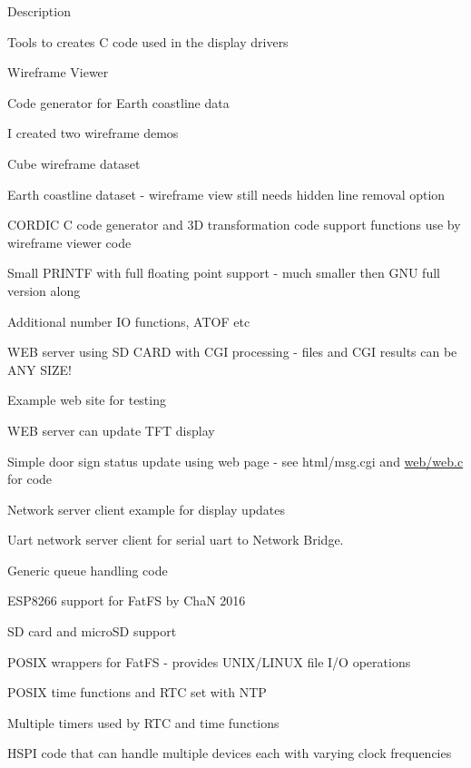 \begin{DoxyParagraph}{Description}
\begin{DoxyItemize}
\begin{DoxyItemize}
\begin{DoxyItemize}
\item Tools to creates C code used in the display drivers
\end{DoxyItemize}
\item Wireframe Viewer
\begin{DoxyItemize}
\item Code generator for Earth coastline data
\item I created two wireframe demos
\begin{DoxyItemize}
\item Cube wireframe dataset
\item Earth coastline dataset -\/ wireframe view still needs hidden line removal option
\end{DoxyItemize}
\end{DoxyItemize}
\item C\+O\+R\+D\+IC C code generator and 3D transformation code support functions use by wireframe viewer code
\item Small P\+R\+I\+N\+TF with full floating point support -\/ much smaller then G\+NU full version along
\item Additional number IO functions, A\+T\+OF etc
\item W\+EB server using SD C\+A\+RD with C\+GI processing -\/ files and C\+GI results can be A\+NY S\+I\+Z\+E!
\begin{DoxyItemize}
\item Example web site for testing
\item W\+EB server can update T\+FT display
\begin{DoxyItemize}
\item Simple door sign status update using web page -\/ see html/msg.\+cgi and \hyperlink{web_8c}{web/web.\+c} for code
\end{DoxyItemize}
\end{DoxyItemize}
\item Network server client example for display updates
\item Uart network server client for serial uart to Network Bridge.
\item Generic queue handling code
\item E\+S\+P8266 support for Fat\+FS by ChaN 2016
\begin{DoxyItemize}
\item SD card and micro\+SD support
\end{DoxyItemize}
\item P\+O\+S\+IX wrappers for Fat\+FS -\/ provides U\+N\+I\+X/\+L\+I\+N\+UX file I/O operations
\item P\+O\+S\+IX time functions and R\+TC set with N\+TP
\item Multiple timers used by R\+TC and time functions
\item H\+S\+PI code that can handle multiple devices each with varying clock frequencies
\end{DoxyItemize}
\end{DoxyItemize}
\end{DoxyParagraph}
